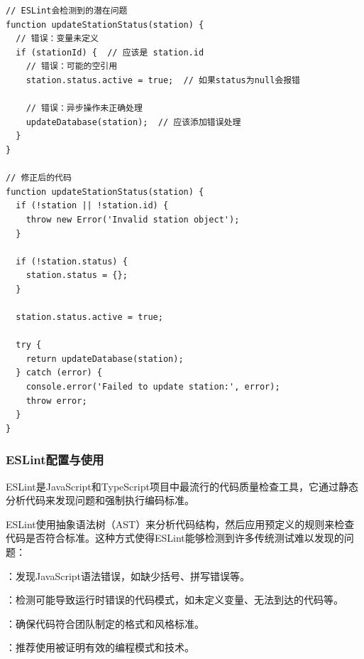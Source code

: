 \begin{lstlisting}[style=javascript]
// ESLint会检测到的潜在问题
function updateStationStatus(station) {
  // 错误：变量未定义
  if (stationId) {  // 应该是 station.id
    // 错误：可能的空引用
    station.status.active = true;  // 如果status为null会报错
    
    // 错误：异步操作未正确处理
    updateDatabase(station);  // 应该添加错误处理
  }
}

// 修正后的代码
function updateStationStatus(station) {
  if (!station || !station.id) {
    throw new Error('Invalid station object');
  }
  
  if (!station.status) {
    station.status = {};
  }
  
  station.status.active = true;
  
  try {
    return updateDatabase(station);
  } catch (error) {
    console.error('Failed to update station:', error);
    throw error;
  }
}
\end{lstlisting}

\hypertarget{eslintux914dux7f6eux4e0eux4f7fux7528}{%
\subsubsection{ESLint配置与使用}\label{eslintux914dux7f6eux4e0eux4f7fux7528}}

ESLint是JavaScript和TypeScript项目中最流行的代码质量检查工具，它通过静态分析代码来发现问题和强制执行编码标准。


ESLint使用抽象语法树（AST）来分析代码结构，然后应用预定义的规则来检查代码是否符合标准。这种方式使得ESLint能够检测到许多传统测试难以发现的问题：

：发现JavaScript语法错误，如缺少括号、拼写错误等。

：检测可能导致运行时错误的代码模式，如未定义变量、无法到达的代码等。

：确保代码符合团队制定的格式和风格标准。

：推荐使用被证明有效的编程模式和技术。


